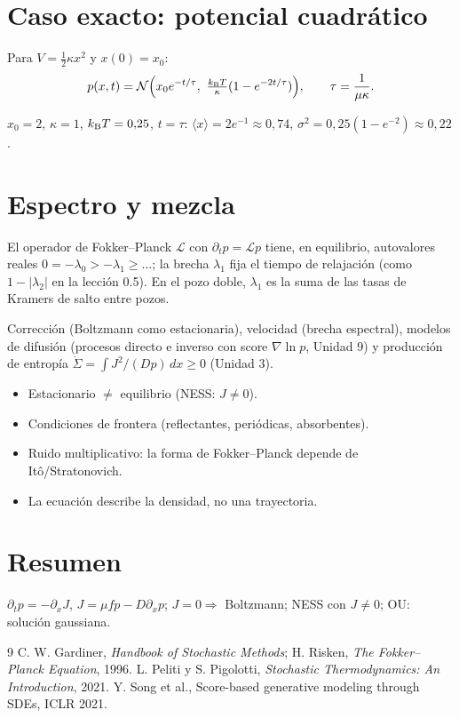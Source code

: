 \documentclass[11pt,a4paper]{article}
\begin{document}
\section{Caso exacto: potencial cuadrático}
Para $V=\frac12\kappa x^2$ y $x(0)=x_0$:
\begin{equation}p(x,t)=\mathcal{N}\Big(x_0e^{-t/\tau},\ \tfrac{k_{\mathrm B} T}{\kappa}(1-e^{-2t/\tau})\Big),\qquad\tau=\frac1{\mu\kappa}.\end{equation}
\begin{ejemplo}
$x_0=2$, $\kappa=1$, $k_{\mathrm B} T=0{,}25$, $t=\tau$: $\langle x\rangle=2e^{-1}\approx0{,}74$, $\sigma^2=0{,}25(1-e^{-2})\approx0{,}22$.
\end{ejemplo}

\section{Espectro y mezcla}
El operador de Fokker--Planck $\mathcal L$ con $\partial_tp=\mathcal Lp$ tiene, en equilibrio, autovalores reales
$0=-\lambda_0>-\lambda_1\ge\dots$; la brecha $\lambda_1$ fija el tiempo de relajación (como $1-|\lambda_2|$ en la lección 0.5).
En el pozo doble, $\lambda_1$ es la suma de las tasas de Kramers de salto entre pozos.

\begin{aplicacion}
Corrección (Boltzmann como estacionaria), velocidad (brecha espectral), modelos de difusión (procesos directo e inverso
con score $\nabla\ln p$, Unidad 9) y producción de entropía $\dot\Sigma=\int J^2/(Dp)\,dx\ge0$ (Unidad 3).
\end{aplicacion}

\begin{error}
\begin{itemize}[nosep]
\item Estacionario $\neq$ equilibrio (NESS: $J\neq0$).
\item Condiciones de frontera (reflectantes, periódicas, absorbentes).
\item Ruido multiplicativo: la forma de Fokker--Planck depende de Itô/Stratonovich.
\item La ecuación describe la densidad, no una trayectoria.
\end{itemize}
\end{error}

\section{Resumen}
$\partial_tp=-\partial_xJ$, $J=\mu fp-D\partial_xp$; $J=0\Rightarrow$ Boltzmann; NESS con $J\neq0$; OU: solución gaussiana.

\begin{thebibliography}{9}\small
{} C. W. Gardiner, \emph{Handbook of Stochastic Methods}; H. Risken, \emph{The Fokker--Planck Equation}, 1996.
 L. Peliti y S. Pigolotti, \emph{Stochastic Thermodynamics: An Introduction}, 2021.
 Y. Song et al., Score-based generative modeling through SDEs, ICLR 2021.
\end{thebibliography}
\end{document}
